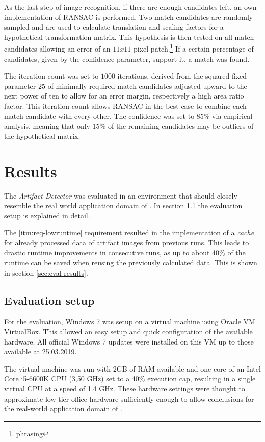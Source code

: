 As the last step of image recognition, if there are enough candidates left, an own implementation of RANSAC is performed. Two match candidates are randomly sampled and are used to calculate translation and scaling factors for a hypothetical transformation matrix. This hypothesis is then tested on all match candidates allowing an error of an $11x11$ pixel patch.\footnote{phrasing} If a certain percentage of candidates, given by the confidence parameter, support it, a match was found.

The iteration count was set to $1000$ iterations, derived from the squared fixed parameter $25$ of minimally required match candidates adjusted upward to the next power of ten to allow for an error margin, respectively a high area ratio factor. This iteration count allows RANSAC in the best case to combine each match candidate with every other. The confidence was set to 85\% via empirical analysis, meaning that only 15\% of the remaining candidates may be outliers of the hypothetical matrix.

\chapter{Results}\label{ch:results}

The \emph{Artifact Detector} was evaluated in an environment that should closely resemble the real world application domain of \ape. In section \ref{sec:eval-env} the evaluation setup is explained in detail.

The \ref{itm:req-lowruntime} requirement resulted in the implementation of a \emph{cache} for already processed data of artifact images from previous runs. This leads to drastic runtime improvements in consecutive runs, as up to about 40\% of the runtime can be saved when reusing the previously calculated data. This is shown in section \ref{sec:eval-results}.


\section{Evaluation setup}\label{sec:eval-env}

For the evaluation, Windows 7 was setup on a virtual machine using Oracle VM VirtualBox\cite{virtualbox}. This allowed an easy setup and quick configuration of the available hardware. All official Windows 7 updates were installed on this VM up to those available at 25.03.2019.

The virtual machine was run with 2GB of RAM available and one core of an Intel Core i5-6600K CPU (3,50 GHz) set to a 40\% execution cap, resulting in a single virtual CPU at a speed of 1.4 GHz. These hardware settings were thought to approximate low-tier office hardware sufficiently enough to allow conclusions for the real-world application domain of \ape.

